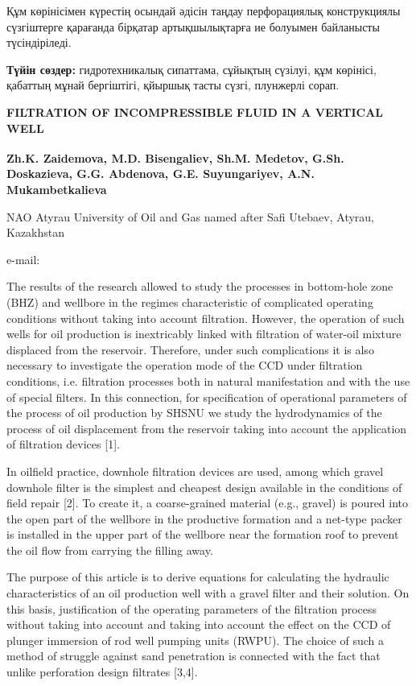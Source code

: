 Құм көрінісімен күрестің осындай әдісін таңдау перфорациялық
конструкциялы сүзгіштерге қарағанда бірқатар артықшылықтарға ие болуымен
байланысты түсіндіріледі.

{\bfseries Түйін сөздер:} гидротехникалық сипаттама, сұйықтың сүзілуі, құм
көрінісі, қабаттың мұнай бергіштігі, қйыршық тасты сүзгі, плунжерлі
сорап.

\begin{articleheader}
{\bfseries FILTRATION OF INCOMPRESSIBLE FLUID IN A VERTICAL WELL}

{\bfseries
Zh.K. Zaidemova,
M.D. Bisengaliev\textsuperscript{\envelope },
Sh.M. Medetov,
G.Sh. Doskazieva,
G.G. Abdenova,
G.E. Suyungariyev,
A.N. Mukambetkalieva
}
\end{articleheader}

\begin{affiliation}
NAO Atyrau University of Oil and Gas named after Safi Utebaev, Atyrau, Kazakhstan

e-mail: \href{mailto:maks_bisengali@mail.ru}{}
\end{affiliation}

The results of the research allowed to study the processes in
bottom-hole zone (BHZ) and wellbore in the regimes characteristic of
complicated operating conditions without taking into account filtration.
However, the operation of such wells for oil production is inextricably
linked with filtration of water-oil mixture displaced from the
reservoir. Therefore, under such complications it is also necessary to
investigate the operation mode of the CCD under filtration conditions,
i.e. filtration processes both in natural manifestation and with the use
of special filters. In this connection, for specification of operational
parameters of the process of oil production by SHSNU we study the
hydrodynamics of the process of oil displacement from the reservoir
taking into account the application of filtration devices {[}1{]}.

In oilfield practice, downhole filtration devices are used, among which
gravel downhole filter is the simplest and cheapest design available in
the conditions of field repair {[}2{]}. To create it, a coarse-grained
material (e.g., gravel) is poured into the open part of the wellbore in
the productive formation and a net-type packer is installed in the upper
part of the wellbore near the formation roof to prevent the oil flow
from carrying the filling away.

The purpose of this article is to derive equations for calculating the
hydraulic characteristics of an oil production well with a gravel filter
and their solution. On this basis, justification of the operating
parameters of the filtration process without taking into account and
taking into account the effect on the CCD of plunger immersion of rod
well pumping units (RWPU). The choice of such a method of struggle
against sand penetration is connected with the fact that unlike
perforation design filtrates {[}3,4{]}.

